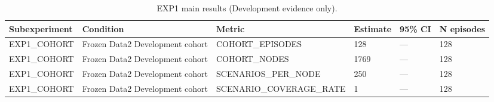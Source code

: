 \begin{table}[ht]
\caption{EXP1 main results (Development evidence only).}
\centering
\begin{tabular}{llllll}
\toprule
Subexperiment & Condition & Metric & Estimate & 95\% CI & N episodes \\
\midrule
EXP1\_COHORT & Frozen Data2 Development cohort & COHORT\_EPISODES & 128 & — & 128 \\
EXP1\_COHORT & Frozen Data2 Development cohort & COHORT\_NODES & 1769 & — & 128 \\
EXP1\_COHORT & Frozen Data2 Development cohort & SCENARIOS\_PER\_NODE & 250 & — & 128 \\
EXP1\_COHORT & Frozen Data2 Development cohort & SCENARIO\_COVERAGE\_RATE & 1 & — & 128 \\
\bottomrule
\end{tabular}
\end{table}

